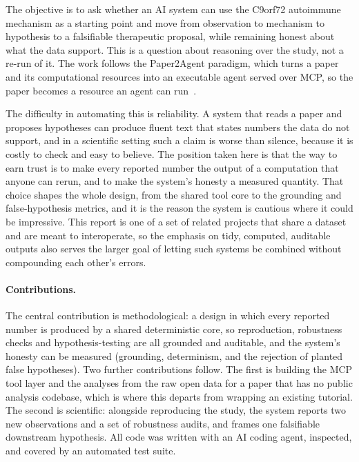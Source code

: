 \documentclass[11pt]{article}
\begin{document}
The objective is to ask whether an AI system can
use the C9orf72 autoimmune mechanism as a starting point and move from observation to mechanism to
hypothesis to a falsifiable therapeutic proposal, while remaining honest about what the data
support. This is a question about reasoning over the study, not a re-run of it. The work follows the
Paper2Agent paradigm, which turns a paper and its computational resources into an executable agent
served over MCP, so the paper becomes a resource an agent can run~\citep{miao2025paper2agent}.

The difficulty in automating this is reliability. A system that reads a paper and proposes
hypotheses can produce fluent text that states numbers the data do not support, and in a scientific
setting such a claim is worse than silence, because it is costly to check and easy to believe. The
position taken here is that the way to earn trust is to make every reported number the output of a
computation that anyone can rerun, and to make the system's honesty a measured quantity. That
choice shapes the whole design, from the shared tool core to the grounding and false-hypothesis
metrics, and it is the reason the system is cautious where it could be impressive. This report is one
of a set of related projects that share a dataset and are meant to interoperate, so the emphasis on
tidy, computed, auditable outputs also serves the larger goal of letting such systems be combined
without compounding each other's errors.

\paragraph{Contributions.}
The central contribution is methodological: a design in which every reported number is produced by a
shared deterministic core, so reproduction, robustness checks and hypothesis-testing are all grounded
and auditable, and the system's honesty can be measured (grounding, determinism, and the rejection of
planted false hypotheses). Two further contributions follow. The first is building the MCP tool layer
and the analyses from the raw open data for a paper that has no public analysis codebase, which is
where this departs from wrapping an existing tutorial. The second is scientific: alongside
reproducing the study, the system reports two new observations and a set of robustness audits, and
frames one falsifiable downstream hypothesis. All code was written with an AI coding agent, inspected,
and covered by an automated test suite.
\end{document}
